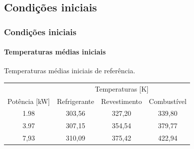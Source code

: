 \documentclass[svgnames,smaller,table]{beamer}
\begin{document}
\subsection{Condições iniciais}
\begin{frame}
  \frametitle{Condições iniciais}
  \framesubtitle{Temperaturas médias iniciais}
  
    \centering
    Temperaturas médias iniciais de referência.
    \\
    \label{tab:temp-keff}
    \begin{tabular}{cccc}
      \multicolumn{1}{l}{}         & \multicolumn{3}{c}{Temperaturas [K]}                                                                        \\ \cline{2-4}
      \multicolumn{1}{c}{Potência [kW]} & \multicolumn{1}{c}{Refrigerante} & \multicolumn{1}{c}{Revestimento} & \multicolumn{1}{c}{Combustível}  \\ \hline
      1.98                      & 303,56                         & 327,20                         & 339,80                           \\ \hline
      3.97                      & 307,15                         & 354,54                         & 379,77                           \\ \hline
      7,93                      & 310,09                         & 375,42                         & 422,94                                         
    \end{tabular}
\end{frame}
\end{document}
